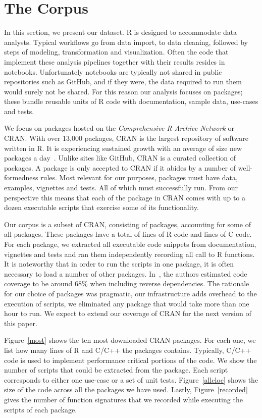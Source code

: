 \documentclass[acmsmall,10pt,review,anonymous]{acmart}\settopmatter{printfolios=true,printccs=false,printacmref=false}
\begin{document}
\section{The Corpus}\label{sec:corpus}

In this section, we present our dataset. R is designed to accommodate data
analysts.  Typical workflows go from data import, to data cleaning, followed
by steps of modeling, transformation and visualization. Often the code that
implement these analysis pipelines together with their results resides in
notebooks. Unfortunately notebooks are typically not shared in public
repositories such as GitHub, and if they were, the data required to run them
would surely not be shared. For this reason our analysis focuses on
packages; these bundle reusable units of R code with documentation, sample
data, use-cases and tests.

We focus on packages hosted on the \emph{Comprehensive R Archive Network} or
CRAN.  With over 13,000 packages, CRAN is the largest repository of software
written in R. It is experiencing sustained growth with an average of size
new packages a day~\cite{LIgges2017}.  Unlike sites like GitHub, CRAN is a
curated collection of packages. A package is only accepted to CRAN if it
abides by a number of well-formedness rules.  Most relevant for our
purposes, packages must have data, examples, vignettes and tests. All of
which must successfully run. From our perspective this means that each of
the package in CRAN comes with up to a dozen executable scripts that
exercise some of its functionality.


Our corpus is a subset of CRAN, consisting of \PACKAGES packages, accounting
for some \PERCENTCRAN of all packages.  These packages have a total of \RLOC
lines of R code and \CLOC lines of C code. For each package, we extracted
all executable code snippets from documentation, vignettes and tests and ran
them independently recording all call to R functions.  It is noteworthy that
in order to run the scripts in one package, it is often necessary to load a
number of other packages.  In~\cite{issta18}, the authors estimated code
coverage to be around 68\% when including reverse dependencies.  The
rationale for our choice of packages was pragmatic, our infrastructure adds
overhead to the execution of scripts, we eliminated any package that would
take more than one hour to run. We expect to extend our coverage of CRAN for
the next version of this paper.

Figure~\ref{most} shows the ten most downloaded CRAN packages.  For each
one, we list how many lines of R and C/C++ the packages contains.
Typically, C/C++ code is used to implement performance critical portions of
the code. We show the number of scripts that could be extracted from the
package. Each script corresponds to either one use-case or a set of unit
tests.  Figure~\ref{allcloc} shows the size of the code across all the
packages we have used.  Lastly, Figure~\ref{recorded} gives the number of
function signatures that we recorded while executing the scripts of each
package.
\end{document}
